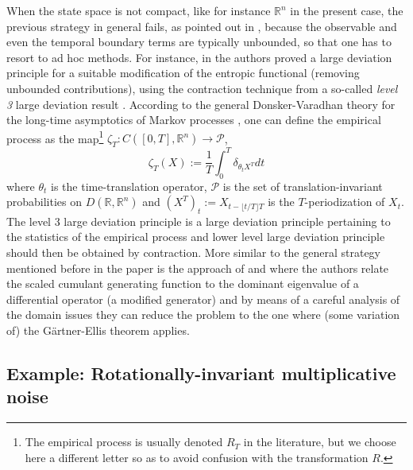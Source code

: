 \documentclass[a4paper,11pt]{article}
\numberwithin{equation}{section}
\begin{document}
When the state space is not compact, like for instance $\mathbb{R}^n$ in the present case, the previous strategy in general fails, as pointed out in \cite{JPS17}, because the observable and even the temporal boundary terms are typically unbounded, so that one has to resort to ad hoc methods. For instance, in \cite{BGL23} the authors proved a large deviation principle for a suitable modification of the entropic functional (removing unbounded contributions), using the contraction technique from a so-called \emph{level 3} large deviation result \cite{BGL23,Var84}. According to the general Donsker-Varadhan theory for the long-time asymptotics of Markov processes \cite{DV75a,DV75b,DV76,DV83}, one can define the empirical process as the map\footnote{The empirical process is usually denoted $R_T$ in the literature, but we choose here a different letter so as to avoid confusion with the transformation $R$.} $\zeta_T: C([0,T],\mathbb{R}^n) \to \mathcal{P}$, 
\begin{equation}
    \zeta_T(X) := \frac{1}{T}\int_0^T \delta_{\theta_t X^T} dt
\end{equation}
where $\theta_t$ is the time-translation operator, $\mathcal{P}$ is the set of translation-invariant probabilities on $D(\mathbb{R}, \mathbb{R}^n)$ and $(X^T)_t := X_{t- \lfloor t/T \rfloor T}$
is the $T$-periodization of $X_t$. The level 3 large deviation principle is a large deviation principle pertaining to the statistics of the empirical process and lower level large deviation principle should then be obtained by contraction. More similar to the general strategy mentioned before in the paper is the approach of \cite{BdG15} and \cite{Raq24} where the authors relate the scaled cumulant generating function to the dominant eigenvalue of a differential operator (a modified generator) and by means of a careful analysis of the domain issues they can reduce the problem to the one where (some variation of) the G\"artner-Ellis theorem applies. 

    


 




\subsection{Example: Rotationally-invariant multiplicative noise}
\end{document}
